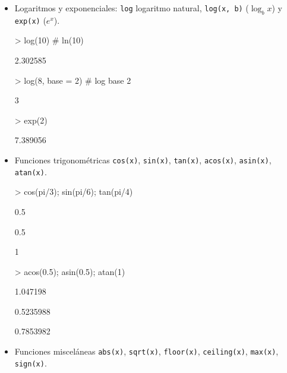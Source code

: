 \documentclass[12pt]{article}
\begin{document}
\begin{itemize}
\item Logaritmos y exponenciales: \verb|log| logaritmo natural,  \verb|log(x, b)| ($\log_b x$) y \verb|exp(x)| ($e^x$).

\begin{Schunk}
\begin{Sinput}
> log(10)        # ln(10)
\end{Sinput}
\begin{Soutput}
[1] 2.302585
\end{Soutput}
\begin{Sinput}
> log(8, base = 2)  # log base 2
\end{Sinput}
\begin{Soutput}
[1] 3
\end{Soutput}
\begin{Sinput}
> exp(2)
\end{Sinput}
\begin{Soutput}
[1] 7.389056
\end{Soutput}
\end{Schunk}

\item Funciones trigonométricas \verb|cos(x)|, \verb|sin(x)|, \verb|tan(x)|, \verb|acos(x)|, \verb|asin(x)|, \verb|atan(x)|.

\begin{Schunk}
\begin{Sinput}
> cos(pi/3); sin(pi/6); tan(pi/4)
\end{Sinput}
\begin{Soutput}
[1] 0.5
\end{Soutput}
\begin{Soutput}
[1] 0.5
\end{Soutput}
\begin{Soutput}
[1] 1
\end{Soutput}
\begin{Sinput}
> acos(0.5); asin(0.5); atan(1)
\end{Sinput}
\begin{Soutput}
[1] 1.047198
\end{Soutput}
\begin{Soutput}
[1] 0.5235988
\end{Soutput}
\begin{Soutput}
[1] 0.7853982
\end{Soutput}
\end{Schunk}

\item Funciones misceláneas \verb|abs(x)|,  \verb|sqrt(x)|,  \verb|floor(x)|,  \verb|ceiling(x)|, \verb|max(x)|,  \verb|sign(x)|.


\end{itemize}
\end{document}
